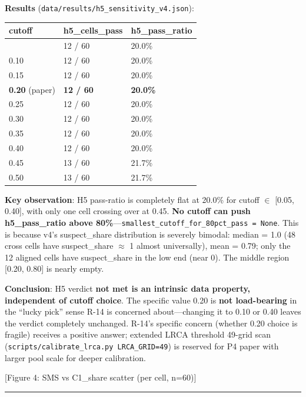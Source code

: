 \documentclass[review,12pt,authoryear]{elsarticle}
\begin{document}
\textbf{Results} (\texttt{data/results/h5\_sensitivity\_v4.json}):

{\def\LTcaptype{none} %
\begin{longtable}[]{@{}lll@{}}
\toprule\noalign{}
cutoff & h5\_cells\_pass & h5\_pass\_ratio \\
\midrule\noalign{}
\endhead
\bottomrule\noalign{}
\endlastfoot
0.05 & 12 / 60 & 20.0\% \\
0.10 & 12 / 60 & 20.0\% \\
0.15 & 12 / 60 & 20.0\% \\
\textbf{0.20} (paper) & \textbf{12 / 60} & \textbf{20.0\%} \\
0.25 & 12 / 60 & 20.0\% \\
0.30 & 12 / 60 & 20.0\% \\
0.35 & 12 / 60 & 20.0\% \\
0.40 & 12 / 60 & 20.0\% \\
0.45 & 13 / 60 & 21.7\% \\
0.50 & 13 / 60 & 21.7\% \\
\end{longtable}
}

\textbf{Key observation}: H5 pass-ratio is completely flat at 20.0\% for
cutoff $\in$ {[}0.05, 0.40{]}, with only one cell crossing over at 0.45.
\textbf{No cutoff can push h5\_pass\_ratio above
80\%}---\texttt{smallest\_cutoff\_for\_80pct\_pass\ =\ None}. This is
because v4's suspect\_share distribution is severely bimodal: median =
1.0 (48 cross cells have suspect\_share $\approx$ 1 almost universally), mean =
0.79; only the 12 aligned cells have suspect\_share in the low end (near
0). The middle region {[}0.20, 0.80{]} is nearly empty.

\textbf{Conclusion}: H5 verdict \textbf{not met is an intrinsic data
property, independent of cutoff choice}. The specific value 0.20 is
\textbf{not load-bearing} in the ``lucky pick'' sense R-14 is concerned
about---changing it to 0.10 or 0.40 leaves the verdict completely
unchanged. R-14's specific concern (whether 0.20 choice is fragile)
receives a positive answer; extended LRCA threshold 49-grid scan
(\texttt{scripts/calibrate\_lrca.py\ LRCA\_GRID=49}) is reserved for P4
paper with larger pool scale for deeper calibration.

{[}Figure 4: SMS vs C1\_share scatter (per cell, n=60){]}

\begin{center}\rule{0.5\linewidth}{0.5pt}\end{center}
\end{document}
